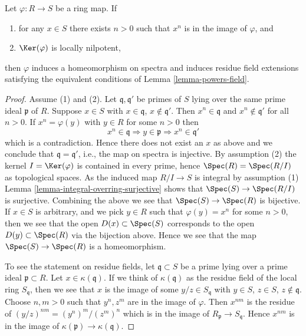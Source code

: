 \begin{lemma}
\label{lemma-powers}
Let $\varphi : R \to S$ be a ring map. If
\begin{enumerate}
\item for any $x \in S$ there exists $n > 0$ such that
$x^n$ is in the image of $\varphi$, and
\item $\Ker(\varphi)$ is locally nilpotent,
\end{enumerate}
then $\varphi$ induces a homeomorphism on spectra and induces residue
field extensions satisfying the equivalent conditions of
Lemma \ref{lemma-powers-field}.
\end{lemma}

\begin{proof}
Assume (1) and (2). Let $\mathfrak q, \mathfrak q'$ be primes of $S$
lying over the same prime ideal $\mathfrak p$ of $R$. Suppose $x \in S$ with
$x \in \mathfrak q$, $x \not \in \mathfrak q'$. Then $x^n \in \mathfrak q$
and $x^n \not \in \mathfrak q'$ for all $n > 0$. If $x^n = \varphi(y)$ with
$y \in R$ for some $n > 0$ then
$$
x^n \in \mathfrak q \Rightarrow y \in \mathfrak p \Rightarrow
x^n \in \mathfrak q'
$$
which is a contradiction. Hence there does not exist an $x$ as above and
we conclude that $\mathfrak q = \mathfrak q'$, i.e., the map on spectra
is injective. By assumption (2) the kernel $I = \Ker(\varphi)$ is
contained in every prime, hence $\Spec(R) = \Spec(R/I)$ as
topological spaces. As the induced map $R/I \to S$ is integral by
assumption (1)
Lemma \ref{lemma-integral-overring-surjective}
shows that $\Spec(S) \to \Spec(R/I)$ is surjective. Combining
the above we see that $\Spec(S) \to \Spec(R)$ is bijective.
If $x \in S$ is arbitrary, and we pick $y \in R$ such that
$\varphi(y) = x^n$ for some $n > 0$, then we see that the open
$D(x) \subset \Spec(S)$ corresponds to the open
$D(y) \subset \Spec(R)$ via the bijection above. Hence we see that
the map $\Spec(S) \to \Spec(R)$ is a homeomorphism.

\medskip\noindent
To see the statement on residue fields, let $\mathfrak q \subset S$
be a prime lying over a prime ideal $\mathfrak p \subset R$. Let
$x \in \kappa(\mathfrak q)$. If we think of $\kappa(\mathfrak q)$
as the residue field of the local ring $S_\mathfrak q$, then we
see that $x$ is the image of some $y/z \in S_\mathfrak q$
with $y \in S$, $z \in S$, $z \not \in \mathfrak q$.
Choose $n, m > 0$ such that $y^n, z^m$ are in the image of $\varphi$.
Then $x^{nm}$ is the residue of $(y/z)^{nm} = (y^n)^m/(z^m)^n$
which is in the image of $R_\mathfrak p \to S_\mathfrak q$.
Hence $x^{nm}$ is in the image of
$\kappa(\mathfrak p) \to \kappa(\mathfrak q)$.
\end{proof}